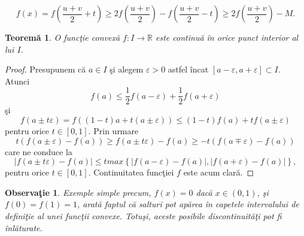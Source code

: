\documentclass[a4paper,12pt,oneside]{report}
\newtheorem{theorem}{Teorem\u a}
\newtheorem{remark}{Observa\c{t}ie}
\begin{document}
\begin{displaymath}
  f\left ( x \right )=  f\left ( \frac{u+v}{2} + t\right )\geq 2 f\left ( \frac{u + v}{2} \right )- f\left ( \frac{u + v}{2} - t\right )\geq 2f\left ( \frac{u+v}{2} \right ) - M.
\end{displaymath}

\begin{theorem}
O func\c{t}ie convex\u{a} \(f: I \rightarrow \mathbb{R}\) este continu\u{a} \^{i}n orice punct interior al lui \(I\).
\end{theorem}
\begin{proof}
  Presupunem c\u{a} \(a\in I\) \c{s}i alegem \(\varepsilon > 0\) astfel \^{i}ncat \(\left [ a - \varepsilon , a + \varepsilon  \right ] \subset I\).
 Atunci
\begin{displaymath}
  f\left ( a \right )\leq \frac{1}{2} f\left ( a - \varepsilon  \right ) + \frac{1}{2}f \left ( a + \varepsilon  \right )
\end{displaymath}
\c{s}i
\begin{displaymath}
  f\left ( a \pm t\varepsilon  \right )= f\left ( \left ( 1 - t \right ) a + t\left ( a \pm \varepsilon  \right )\right )\leq \left ( 1 - t \right )f\left ( a \right ) + tf\left ( a\pm \varepsilon  \right )
\end{displaymath}
pentru orice \(t\in \left [ 0 , 1 \right ]\). Prin urmare
\begin{displaymath}
  t\left ( f\left ( a\pm \varepsilon  \right ) - f\left ( a \right ) \right )\geq f\left ( a\pm t\varepsilon  \right )- f\left ( a \right )\geq -t\left ( f\left ( a\mp \varepsilon  \right ) - f\left ( a \right )\right )
\end{displaymath}
care ne conduce la
\begin{displaymath}
\left | f\left ( a\pm t\varepsilon  \right )- f\left ( a \right ) \right |\leq t max \left \{ \left | f\left ( a-\varepsilon  \right )- f\left ( a \right ) \right |, \left | f\left ( a+\varepsilon  \right ) - f\left ( a \right )\right | \right \},
\end{displaymath}
 pentru orice \(t\in \left [ 0 , 1 \right ]\). Continuitatea func\c{t}iei \(f\) este acum clar\u{a}.
 \end{proof}

 \begin{remark}
  Exemple simple precum, \(f\left ( x \right )= 0\) dac\u{a} \(x\in \left ( 0 , 1 \right )\), \c{s}i  \(f\left ( 0 \right )= f\left ( 1 \right ) = 1\), arat\u{a} faptul c\u{a} salturi  pot ap\u{a}rea \^{i}n capetele intervalului de defini\c{t}ie al unei func\c{t}ii convexe. Totu\c{s}i, aceste posibile discontinuit\u{a}\c{t}i pot fi \^{i}nl\u{a}turate.
\end{remark}
\end{document}
